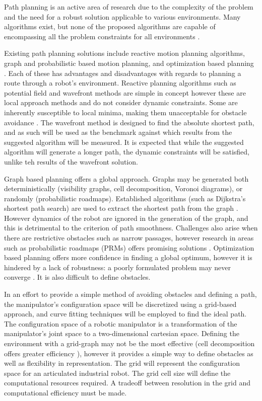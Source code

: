 %
Path planning is an active area of research due to the complexity of the problem and the need for a robust solution applicable to various environments. Many algorithms exist, but none of the proposed algorithms are capable of encompassing all the problem constraints for all environments \cite{sariff06}.

Existing path planning solutions include reactive motion planning algorithms, graph and probabilistic based motion planning, and optimization based planning \cite{waslanderI}. Each of these has advantages and disadvantages with regards to planning a route through a robot's environment. Reactive planning algorithms such as potential field and wavefront methods are simple in concept however these are local approach methods and do not consider dynamic constraints. Some are inherently susceptible to local minima, making them unacceptable for obstacle avoidance \cite{koren91}. The wavefront method is designed to find the absolute shortest path, and as such will be used as the benchmark against which results from the suggested algorithm will be measured. It is expected that while the suggested algorithm will generate a longer path, the dynamic constraints will be satisfied, unlike teh results of the wavefront solution.

Graph based planning offers a global approach. Graphs may be generated both deterministically (visibility graphs, cell decomposition, Voronoi diagrams), or randomly (probabilistic roadmaps). Established algorithms (such as Dijkstra's shortest path search) are used to extract the shortest path from the graph \cite{dijkstra59}. However dynamics of the robot are ignored in the generation of the graph, and this is detrimental to the criterion of path smoothness. Challenges also arise when there are restrictive obstacles such as narrow passages, however research in areas such as probabilistic roadmaps (PRMs) offers promising solutions \cite{hsu03}. Optimization based planning offers more confidence in finding a global optimum, however it is hindered by a lack of robustness: a poorly formulated problem may never converge \cite{waslanderIII}. It is also difficult to define obstacles.

In an effort to provide a simple method of avoiding obstacles and defining a path, the manipulator's configuration space will be discretized using a grid-based approach, and curve fitting techniques will be employed to find the ideal path. The configuration space of a robotic manipulator is a transformation of the manipulator's joint space to a two-dimensional cartesian space. Defining the environment with a grid-graph may not be the most effective (cell decomposition offers greater efficiency \cite{lingelbach04}), however it provides a simple way to define obstacles as well as flexibility in representation. The grid will represent the configuration space for an articulated industrial robot. The grid cell size will define the computational resources required. A tradeoff between resolution in the grid and computational efficiency must be made.

